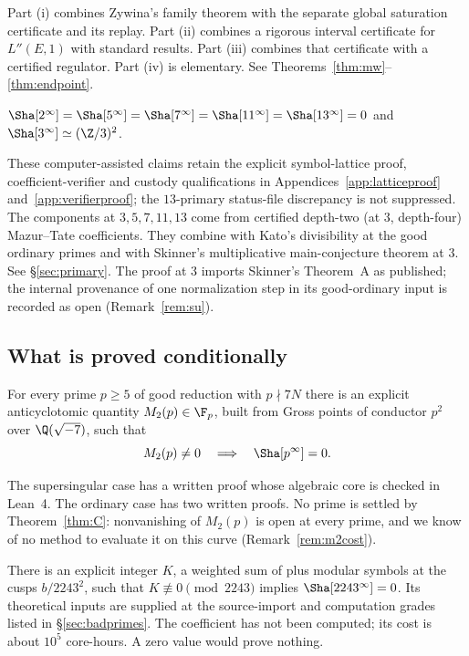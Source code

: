 Part (i) combines Zywina's family theorem \cite{zywina} with the separate global saturation certificate and its replay. Part (ii) combines a rigorous interval certificate for $L''(E,1)$ with standard results. Part (iii) combines that certificate with a certified regulator. Part (iv) is elementary. See Theorems~\ref{thm:mw}--\ref{thm:endpoint}.

\begin{theorem}\label{thm:B}
$\Sha[2^\infty]=\Sha[5^\infty]=\Sha[7^\infty]=\Sha[11^\infty]=\Sha[13^\infty]=0$ and $\Sha[3^\infty]\simeq(\Z/3)^2$.
\end{theorem}

These computer-assisted claims retain the explicit symbol-lattice proof, coefficient-verifier and custody qualifications in Appendices~\ref{app:latticeproof} and~\ref{app:verifierproof}; the $13$-primary status-file discrepancy is not suppressed. The components at $3,5,7,11,13$ come from certified depth-two (at $3$, depth-four) Mazur--Tate coefficients. They combine with Kato's divisibility at the good ordinary primes and with Skinner's multiplicative main-conjecture theorem at $3$. See \S\ref{sec:primary}. The proof at $3$ imports Skinner's Theorem~A as published; the internal provenance of one normalization step in its good-ordinary input is recorded as open (Remark~\ref{rem:su}).

\subsection{What is proved conditionally}
\begin{theorem}\label{thm:C}
For every prime $p\ge5$ of good reduction with $p\nmid 7N$ there is an explicit anticyclotomic quantity $M_2(p)\in\F_p$, built from Gross points of conductor $p^2$ over $\Q(\sqrt{-7})$, such that
\[
M_2(p)\neq0\quad\Longrightarrow\quad \Sha[p^\infty]=0 .
\]
\end{theorem}
The supersingular case has a written proof whose algebraic core is checked in Lean~4. The ordinary case has two written proofs. No prime is settled by Theorem~\ref{thm:C}: nonvanishing of $M_2(p)$ is open at every prime, and we know of no method to evaluate it on this curve (Remark~\ref{rem:m2cost}).

\begin{theorem}\label{thm:D}
There is an explicit integer $K$, a weighted sum of plus modular symbols at the cusps $b/2243^2$, such that $K\not\equiv0\pmod{2243}$ implies $\Sha[2243^\infty]=0$. Its theoretical inputs are supplied at the source-import and computation grades listed in \S\ref{sec:badprimes}. The coefficient has not been computed; its cost is about $10^5$ core-hours. A zero value would prove nothing.
\end{theorem}

